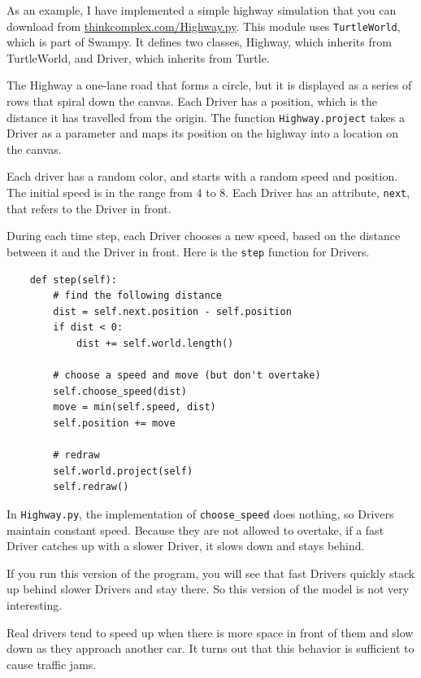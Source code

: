 \documentclass[10pt]{book}
\begin{document}
As an example, I have implemented a simple highway simulation that you
can download from \url{thinkcomplex.com/Highway.py}.  This
module uses {\tt TurtleWorld}, which is part of Swampy.  It defines
two classes, Highway, which inherits from TurtleWorld, and Driver,
which inherits from Turtle.

The Highway a one-lane road that forms a circle, but it is displayed
as a series of rows that spiral down the canvas.  Each Driver has
a position, which is the distance it has travelled from the origin.
The function {\tt Highway.project} takes a Driver as a parameter
and maps its position on the highway into a location on the
canvas. 

Each driver has a random color, and starts with a random speed and
position.  The initial speed is in the range from 4 to 8.  Each
Driver has an attribute, {\tt next}, that refers to the Driver in
front.

During each time step, each Driver chooses a new speed, based on the
distance between it and the Driver in front.  Here is the {\tt step}
function for Drivers.

\begin{verbatim}
    def step(self):
        # find the following distance
        dist = self.next.position - self.position
        if dist < 0:
            dist += self.world.length()

        # choose a speed and move (but don't overtake)
        self.choose_speed(dist)
        move = min(self.speed, dist)
        self.position += move

        # redraw
        self.world.project(self)
        self.redraw()
\end{verbatim}

In {\tt Highway.py}, the implementation of \verb"choose_speed"
does nothing, so Drivers maintain constant speed.  Because
they are not allowed to overtake, if a fast Driver catches up
with a slower Driver, it slows down and stays behind.

If you run this version of the program, you will see that fast
Drivers quickly stack up behind slower Drivers and stay there.
So this version of the model is not very interesting.

Real drivers tend to speed up when there is more space
in front of them and slow down as they approach another car.
It turns out that this behavior is sufficient to cause
traffic jams.
\end{document}

